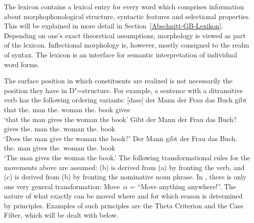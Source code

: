 The lexicon contains a lexical entry for every word which comprises information about morphophonological structure, syntactic features
and selectional properties. This will be explained in more detail in Section~\ref{Abschnitt-GB-Lexikon}. Depending on one's exact theoretical
assumptions, morphology is viewed as part of the lexicon. Inflectional morphology is, however, mostly consigned
to the realm of syntax. The lexicon is an interface for semantic interpretation of individual word forms.

The surface position in which constituents are realized is not necessarily the position they have in
D"=structure. For example, a sentence with a ditransitive verb has the following ordering variants:
\eal
\ex 
\gll {}[dass] der Mann der Frau das Buch gibt\\
	 {}\spacebr{}that the.\nom{} man the.\dat{} woman the.\acc{} book gives\\
\glt `that the man gives the woman the book'
\ex 
\gll Gibt der Mann der Frau das Buch?\\
	 gives the.\nom{} man the.\dat{} woman the.\acc{} book\\
\glt `Does the man give the woman the book?'
\ex 
\gll Der Mann gibt der Frau das Buch.\\
	 the.\nom{} man gives the.\dat{} woman the.\acc{} book\\
\glt `The man gives the woman the book.'
\zl
The following transformational rules for the movements above are assumed: (b) is derived from (a) by fronting the verb, 
and (c) is derived from (b) by fronting the nominative noun phrase. In \gbt, there is only one very general transformation:
Move~$\alpha$ = ``Move anything anywhere!''. The nature of what exactly can be moved where and for which reason is determined
by principles. Examples of such principles are the Theta Criterion and the Case Filter, which will be
dealt with below.

